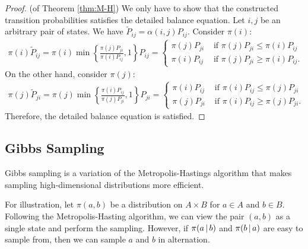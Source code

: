 \documentclass[a4paper,12pt]{article}
\begin{document}
\begin{proof}(of Theorem \ref{thm:M-H})
	We only have to show that the constructed transition probabilities satisfies the detailed balance equation.
	Let $i,j$ be an arbitrary pair of states.
	We have $\tilde{P}_{ij}=\alpha(i,j)P_{ij}$.
	Consider $\pi(i)$:
	\begin{align*}
		\pi(i)\tilde{P}_{ij}
		= \pi(i)\min\left\{\frac{\pi(j)P_{ji}}{\pi(i)P_{ij}},1\right\}P_{ij}
		=
		\begin{cases}
			\pi(j)P_{ji} & \text{ if } \pi(j)P_{ji} \leq \pi(i)P_{ij} \\
			\pi(i)P_{ij} & \text{ if } \pi(j)P_{ji} \geq \pi(i)P_{ij}.
		\end{cases}
	\end{align*}
	On the other hand, consider $\pi(j)$:
	\begin{align*}
		\pi(j)\tilde{P}_{ji}
		= \pi(j)\min\left\{\frac{\pi(i)P_{ij}}{\pi(j)P_{ji}},1\right\}P_{ji}
		=
		\begin{cases}
			\pi(i)P_{ij} & \text{ if } \pi(i)P_{ij} \leq \pi(j)P_{ji} \\
			\pi(j)P_{ji} & \text{ if } \pi(i)P_{ij} \geq \pi(j)P_{ji}.
		\end{cases}
	\end{align*}
	Therefore, the detailed balance equation is satisfied.
\end{proof}

\subsection{Gibbs Sampling}

Gibbs sampling is a variation of the Metropolis-Hastings algorithm
that makes sampling high-dimensional distributions more efficient.

For illustration, let $\pi(a,b)$ be a distribution on $A\times B$ for $a\in A$ and $b\in B$.
Following the Metropolis-Hasting algorithm, we can view the pair $(a,b)$ as a single state and perform the sampling.
However, if $\pi(a\,|\, b)$ and $\pi(b\,|\, a)$ are easy to sample from, then we can sample $a$ and $b$ in alternation.
\end{document}
